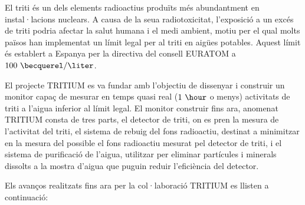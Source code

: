 El triti és un dels elements radioactius produïts més abundantment en instal·lacions nuclears. A causa de la seua radiotoxicitat, l'exposició a un excés de triti podria afectar la salut humana i el medi ambient, motiu per el qual molts països han implementat un límit legal per al triti en aigües potables. Aquest límit és establert a Espanya per la directiva del consell EURATOM \cite{100BqL} a $100~\becquerel/\liter$.

El projecte TRITIUM es va fundar amb l'objectiu de dissenyar i construir un monitor capaç de mesurar en temps quasi real ($1~\hour$ o menys) activitats de triti a l'aigua inferior al límit legal. El monitor construir fins ara, anomenat TRITIUM consta de tres parts, el detector de triti, on es pren la mesura de l'activitat del triti, el sistema de rebuig del fons radioactiu, destinat a minimitzar en la mesura del possible el fons radioactiu mesurat pel detector de triti, i el sistema de purificació de l'aigua, utilitzar per eliminar partícules i minerals dissolts a la mostra d'aigua que puguin reduir l'eficiència del detector.

Els avanços realitzats fins ara per la col·laboració TRITIUM es llisten a continuació:

